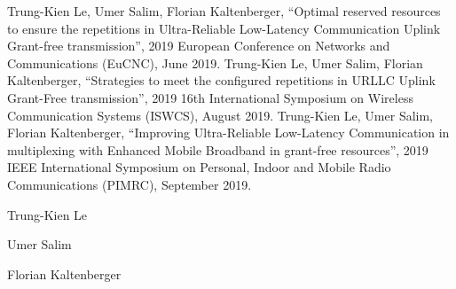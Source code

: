 \documentclass{ieeeaccess}
\begin{document}
\begin{thebibliography}{00}
 Trung-Kien Le, Umer Salim, Florian Kaltenberger, ``Optimal reserved resources to ensure the repetitions in Ultra-Reliable Low-Latency Communication Uplink Grant-free transmission'',  2019 European Conference on Networks and Communications (EuCNC), June 2019.
 Trung-Kien Le, Umer Salim, Florian Kaltenberger, ``Strategies to meet the configured repetitions in URLLC Uplink Grant-Free transmission'',  2019 16th International Symposium on Wireless Communication Systems (ISWCS), August 2019.
 Trung-Kien Le, Umer Salim, Florian Kaltenberger, ``Improving Ultra-Reliable Low-Latency Communication in multiplexing with Enhanced Mobile Broadband in grant-free resources'', 2019 IEEE International Symposium on Personal, Indoor and Mobile Radio Communications (PIMRC), September 2019.
\end{thebibliography}


\begin{IEEEbiography}{Trung-Kien Le} 
\end{IEEEbiography}

\begin{IEEEbiography}{Umer Salim} 
\end{IEEEbiography}

\begin{IEEEbiography}{Florian Kaltenberger} 
\end{IEEEbiography}

\EOD
\end{document}

